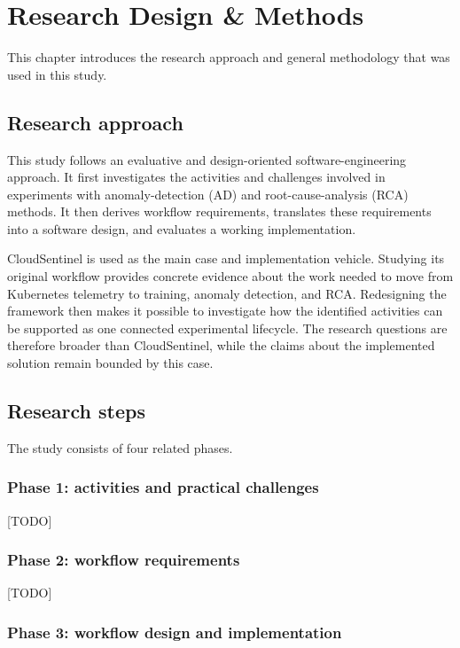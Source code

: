 \chapter{Research Design \& Methods}%
\label{ch:methods}
This chapter introduces the research approach and general methodology that was used in this study.

\section{Research approach}
This study follows an evaluative and design-oriented software-engineering approach. It first investigates the activities and challenges involved in experiments with anomaly-detection (AD) and root-cause-analysis (RCA) methods. It then derives workflow requirements, translates these requirements into a software design, and evaluates a working implementation.

CloudSentinel is used as the main case and implementation vehicle. Studying its original workflow provides concrete evidence about the work needed to move from Kubernetes telemetry to training, anomaly detection, and RCA. Redesigning the framework then makes it possible to investigate how the identified activities can be supported as one connected experimental lifecycle. The research questions are therefore broader than CloudSentinel, while the claims about the implemented solution remain bounded by this case.

\section{Research steps}
The study consists of four related phases.

\subsection{Phase 1: activities and practical challenges}

[TODO]

\subsection{Phase 2: workflow requirements}

[TODO]

\subsection{Phase 3: workflow design and implementation}

